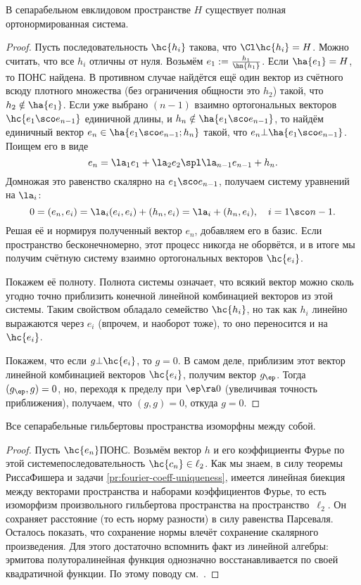 \documentclass[a4paper]{article}
\begin{document}
\begin{theorem}
В сепарабельном евклидовом пространстве $H$ существует полная ортонормированная система.
\end{theorem}
\begin{proof}
Пусть последовательность $\hc{h_i}$ такова, что $\Cl \hc{h_i} = H$. Можно считать,
что все $h_i$ отличны от нуля.
Возьмём $e_1 := \frac{h_1}{\hn{h_1}}$.
Если $\ha{e_1} = H$, то ПОНС найдена. В противном случае
найдётся ещё один вектор из счётного всюду плотного множества (без ограничения
общности это $h_2$) такой, что $h_2 \notin \ha{e_1}$. Если уже
выбрано $(n-1)$ взаимно ортогональных векторов $\hc{e_1\sco e_{n-1}}$ единичной
длины, и $h_n \notin \ha{e_1\sco e_{n-1}}$,
то найдём единичный вектор $e_n \in \ha{e_1\sco e_{n-1}; h_n}$ такой, что $e_n \bot \ha{e_1\sco e_{n-1}}$.
Поищем его в виде
$$e_n = \la_1 e_1 + \la_2 e_2 \spl \la_{n-1}e_{n-1} + h_n.$$
Домножая это равенство скалярно на $e_1\sco e_{n-1}$, получаем систему уравнений на $\la_i$:
$$0 = (e_n, e_i) = \la_i (e_i, e_i) + (h_n, e_i) = \la_i + (h_n, e_i), \quad i = 1\sco n-1.$$
Решая её и нормируя полученный вектор $e_n$, добавляем его в базис.
Если пространство бесконечномерно, этот процесс никогда не оборвётся, и в итоге мы получим
счётную систему взаимно ортогональных векторов $\hc{e_i}$.

Покажем её полноту.
Полнота системы означает, что всякий вектор можно сколь угодно точно приблизить
конечной линейной комбинацией векторов из этой системы. Таким свойством обладало семейство $\hc{h_i}$,
но так как $h_i$ линейно выражаются через $e_i$ (впрочем, и наоборот тоже), то оно переносится и на $\hc{e_i}$.

Покажем, что если $g \bot \hc{e_i}$, то $g = 0$.
В самом деле, приблизим этот вектор линейной комбинацией векторов $\hc{e_i}$, получим
вектор $g_\ep$. Тогда $(g_\ep, g) = 0$, но, переходя
к пределу при $\ep \ra 0$ (увеличивая точность приближения), получаем, что $(g,g) = 0$, откуда $g = 0$.
\end{proof}

\begin{theorem}
Все сепарабельные гильбертовы пространства изоморфны между собой.
\end{theorem}
\begin{proof}
Пусть $\hc{e_n}$\т ПОНС.
Возьмём вектор $h$ и его коэффициенты Фурье по этой системе\т последовательность $\hc{c_n} \in \ell_2$.
Как мы знаем, в силу теоремы Рисса\ч Фишера и задачи \ref{pr:fourier-coeff-uniqueness},
имеется линейная биекция между векторами пространства и наборами коэффициентов Фурье,
то есть изоморфизм произвольного гильбертова пространства на пространство~$\ell_2$.
Он сохраняет расстояние (то есть норму разности) в силу равенства Парсеваля.
Осталось показать, что сохранение нормы влечёт сохранение скалярного произведения.
Для этого достаточно вспомнить факт из линейной алгебры: эрмитова полуторалинейная
функция однозначно восстанавливается по своей квадратичной функции. По этому поводу
см.~\cite[гл. 5, \S 5]{vinberg}.
\end{proof}
\end{document}
